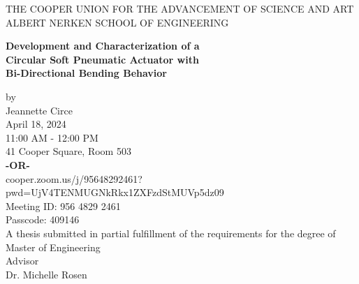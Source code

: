 \documentclass[12pt]{report}
\begin{document}
\begin{center}
\thispagestyle{empty}
\uppercase{THE COOPER UNION FOR THE ADVANCEMENT OF SCIENCE AND ART}\\[-0.9ex]
\uppercase{ALBERT NERKEN SCHOOL OF ENGINEERING}\\[-0.9ex]

\vspace{2cm}
\begin{center}
\textbf{\LARGE{Development and Characterization of a}} \\ 
\textbf{\LARGE{Circular Soft Pneumatic Actuator with}} \\ 
\textbf{\LARGE{Bi-Directional Bending Behavior}}
\medskip\par
\normalsize{by} \\
\Large{Jeannette Circe}\\
\vspace{0.7 cm}
\normalsize{April 18, 2024}\\
\vspace{-0.3 cm}
\normalsize{11:00 AM - 12:00 PM}\\
\vspace{-0.3 cm}
\normalsize{41 Cooper Square, Room 503}\\
\vspace{-0.3 cm}
\textbf{\footnotesize{-OR-}} \\
\normalsize{cooper.zoom.us/j/95648292461?pwd=UjV4TENMUGNkRkx1ZXFzdStMUVp5dz09}\\
\vspace{-0.3 cm}
\normalsize{Meeting ID: 956 4829 2461}\\
\vspace{-0.3 cm}
\normalsize{Passcode: 409146}\\
\vspace{1 cm}
\normalsize{A thesis submitted in partial fulfillment of the requirements for the degree of \\ Master of Engineering } \\
\vspace{1 cm}
\normalsize{Advisor}\\
\normalsize{Dr. Michelle Rosen}\\
\end{center}
\medskip
\end{center}
\clearpage




\tableofcontents
\listoffigures
\end{document}
